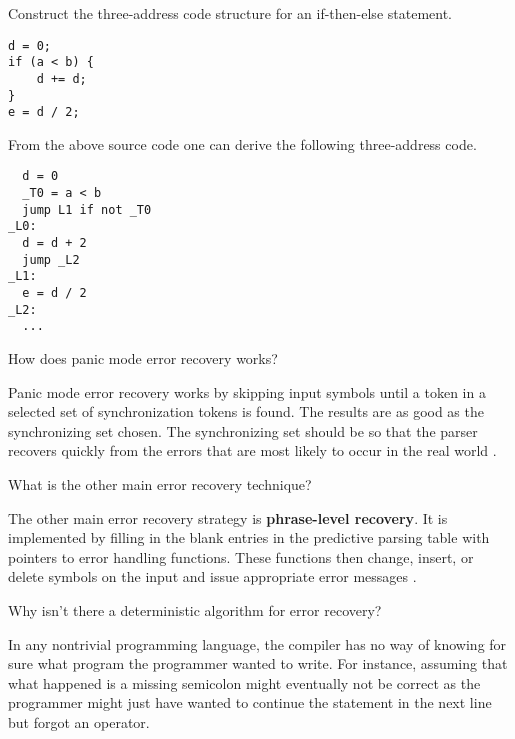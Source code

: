 \begin{Exercise}
Construct the three-address code structure for an if-then-else statement.
\end{Exercise}
\begin{Answer}
\begin{lstlisting}
d = 0;
if (a < b) {
    d += d;
}
e = d / 2;
\end{lstlisting}
From the above source code one can derive the following three-address code.
\begin{lstlisting}
  d = 0
  _T0 = a < b
  jump L1 if not _T0
_L0:
  d = d + 2
  jump _L2
_L1:
  e = d / 2
_L2:
  ...
\end{lstlisting}
\end{Answer}

\begin{Exercise}[difficulty=1]
How does panic mode error recovery works?
\end{Exercise}
\begin{Answer}
Panic mode error recovery works by skipping input symbols until a token in a selected set of synchronization tokens is found.
The results are as good as the synchronizing set chosen.
The synchronizing set should be so that the parser recovers quickly from the errors that are most likely to occur in the real world \cite[p.~229]{compilers-aho-2007}.
\end{Answer}

\begin{Exercise}
What is the other main error recovery technique?
\end{Exercise}
\begin{Answer}
The other main error recovery strategy is \textbf{phrase-level recovery}.
It is implemented by filling in the blank entries in the predictive parsing table with pointers to error handling functions.
These functions then change, insert, or delete symbols on the input and issue appropriate error messages \cite[p.~231]{compilers-aho-2007}.
\end{Answer}

\begin{Exercise}
Why isn't there a deterministic algorithm for error recovery?
\end{Exercise}
\begin{Answer}
In any nontrivial programming language, the compiler has no way of knowing for sure what program the programmer wanted to write.
For instance, assuming that what happened is a missing semicolon might eventually not be correct as the programmer might just have wanted to continue the statement in the next line but forgot an operator.
\end{Answer}

